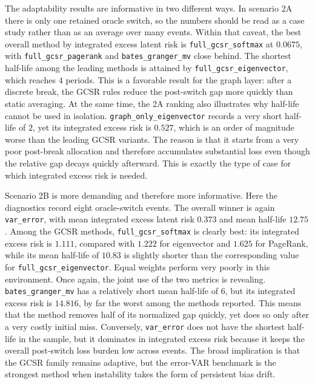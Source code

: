 \documentclass[11pt,a4paper]{article}
\begin{document}
The adaptability results are informative in two different ways. In scenario 2A there is only one retained oracle switch, so the numbers should be read as a case study rather than as an average over many events. Within that caveat, the best overall method by integrated excess latent risk is \texttt{full\_gcsr\_softmax} at $0.0675$, with \texttt{full\_gcsr\_pagerank} and \texttt{bates\_granger\_mv} close behind. The shortest half-life among the leading methods is attained by \texttt{full\_gcsr\_eigenvector}, which reaches $4$ periods. This is a favorable result for the graph layer: after a discrete break, the GCSR rules reduce the post-switch gap more quickly than static averaging. At the same time, the 2A ranking also illustrates why half-life cannot be used in isolation. \texttt{graph\_only\_eigenvector} records a very short half-life of $2$, yet its integrated excess risk is $0.527$, which is an order of magnitude worse than the leading GCSR variants. The reason is that it starts from a very poor post-break allocation and therefore accumulates substantial loss even though the relative gap decays quickly afterward. This is exactly the type of case for which integrated excess risk is needed.

Scenario 2B is more demanding and therefore more informative. Here the diagnostics record eight oracle-switch events. The overall winner is again \texttt{var\_error}, with mean integrated excess latent risk $0.373$ and mean half-life $12.75$. Among the GCSR methods, \texttt{full\_gcsr\_softmax} is clearly best: its integrated excess risk is $1.111$, compared with $1.222$ for eigenvector and $1.625$ for PageRank, while its mean half-life of $10.83$ is slightly shorter than the corresponding value for \texttt{full\_gcsr\_eigenvector}. Equal weights perform very poorly in this environment. Once again, the joint use of the two metrics is revealing. \texttt{bates\_granger\_mv} has a relatively short mean half-life of $6$, but its integrated excess risk is $14.816$, by far the worst among the methods reported. This means that the method removes half of its normalized gap quickly, yet does so only after a very costly initial miss. Conversely, \texttt{var\_error} does not have the shortest half-life in the sample, but it dominates in integrated excess risk because it keeps the overall post-switch loss burden low across events. The broad implication is that the GCSR family remains adaptive, but the error-VAR benchmark is the strongest method when instability takes the form of persistent bias drift.
\end{document}
